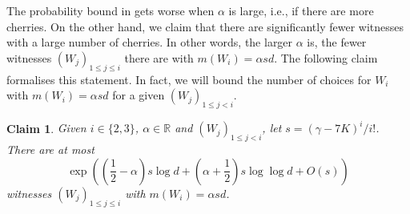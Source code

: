 \documentclass[reqno,a4paper,11pt]{amsart}
\newtheorem{claim}[theorem]{Claim}
\theoremstyle{definition}
\renewcommand{\leq}{\leqslant}
\begin{document}
The probability bound in  gets worse when $\alpha$ is large, i.e., if there are more cherries.
On the other hand, we claim that there are significantly fewer witnesses with a large number of cherries.
In other words, the larger $\alpha$ is, the fewer witnesses $(W_j)_{1 \leq j \leq i}$ there are with $m(W_i)=\alpha sd$.
The following claim formalises this statement.
In fact, we will bound the number of choices for $W_i$ with $m(W_i)=\alpha s d$ for a given $(W_j)_{1 \leq j<i}$.

\begin{claim}\label{c:numberchoicesalpha}
  Given $i \in \{2, 3\}$, $\alpha \in \mathbb{R}$ and $(W_j)_{1 \leq j<i}$, let $s = (\gamma - 7K)^{i}/i!$.
  There are at most
  \[
    \exp\left( \left(\frac{1}{2}-\alpha\right)s \log d + \left(\alpha + \frac{1}{2}\right) s \log \log d + O(s)\right)
  \]
  witnesses $(W_j)_{1 \leq j \leq i}$ with $m(W_i)=\alpha s d$.
\end{claim}
\end{document}
